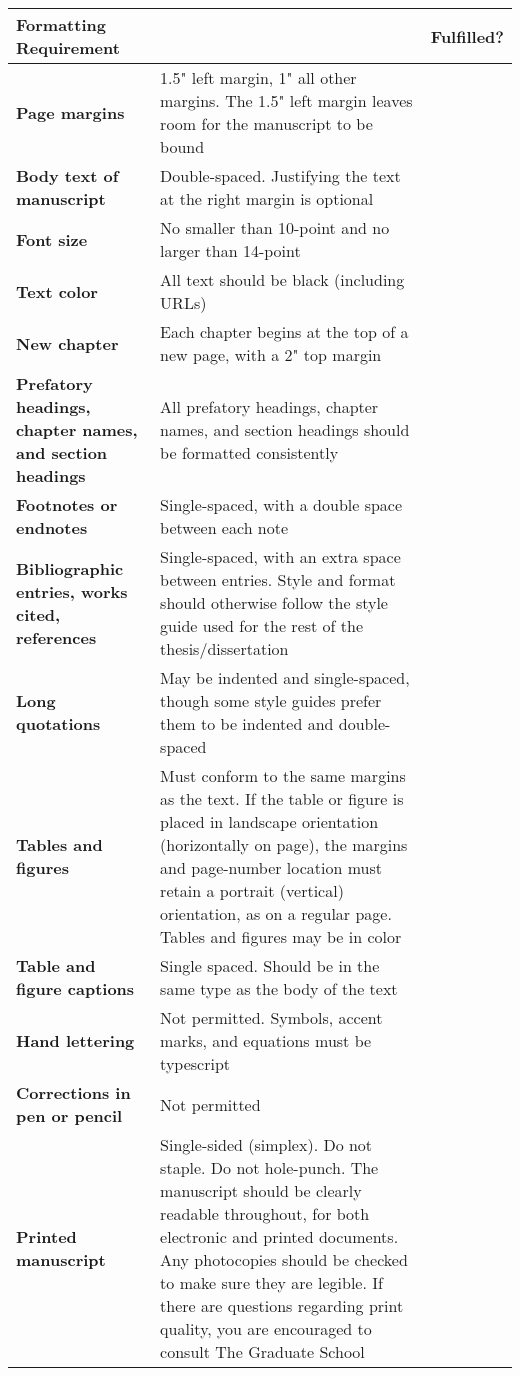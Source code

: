 \begin{tabular}{p{5.5cm}|p{10cm}|l}
\hline
\textbf{Formatting Requirement} &
   &
  \textbf{Fulfilled?} \\ \hline
{\textbf{Page margins}} &
  1.5" left margin, 1" all other margins. The 1.5" left margin leaves room for the manuscript to be bound &
   \\ \hline
{\textbf{Body text of manuscript}} &
  Double-spaced. Justifying the text at the right margin is optional &
   \\ \hline
{\textbf{Font size}} &
  No smaller than 10-point and no larger than 14-point &
   \\ \hline
{\textbf{Text color}} &
  All text should be black (including URLs) &
   \\ \hline
{\textbf{New chapter}} &
  Each chapter begins at the top of a new page, with a 2" top margin &
   \\ \hline
{\textbf{Prefatory headings, chapter names, and section headings}} &
  All prefatory headings, chapter names, and section headings should be formatted consistently &
   \\ \hline
{\textbf{Footnotes or endnotes}} &
  Single-spaced, with a double space between each note &
   \\ \hline
{\textbf{Bibliographic entries, works cited, references}} &
  Single-spaced, with an extra space between entries. Style and format should otherwise follow the style guide used for the rest of the thesis/dissertation &
   \\ \hline
{\textbf{Long quotations}} &
  May be indented and single-spaced, though some style guides prefer them to be indented and double-spaced &
   \\ \hline
{\textbf{Tables and figures}} &
  Must conform to the same margins as the text. If the table or figure is placed in landscape orientation (horizontally on page), the margins and page-number location must retain a portrait (vertical) orientation, as on a regular page. Tables and figures may be in color &
   \\ \hline
{\textbf{Table and figure captions}} &
  Single spaced. Should be in the same type as the body of the text &
   \\ \hline
{\textbf{Hand lettering}} &
  Not permitted. Symbols, accent marks, and equations must be typescript &
   \\ \hline
{\textbf{Corrections in pen or pencil}} &
  Not permitted &
   \\ \hline
{\textbf{Printed manuscript}} &
  Single-sided (simplex). Do not staple. Do not hole-punch. The manuscript should be clearly readable throughout, for both electronic and printed documents. Any photocopies should be checked to make sure they are legible. If there are questions regarding print quality, you are encouraged to consult The Graduate School &
   \\ \hline
\end{tabular}%
